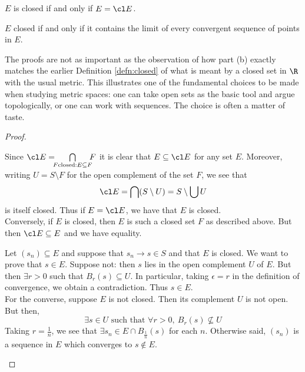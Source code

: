 \begin{thm}
\begin{enumeratea}
	\item $E$ is closed if and only if $E=\cl E$.
	\item $E$ closed if and only if it contains the limit of every convergent sequence of points in $E$.
\end{enumeratea}
\end{thm}

The proofs are not as important as the observation of how part (b) exactly matches the earlier Definition \ref{defn:closed} of what is meant by a closed set in $\R$ with the usual metric. This illustrates one of the fundamental choices to be made when studying metric spaces: one can take open sets as the basic tool and argue topologically, or one can work with sequences. The choice is often a matter of taste.

\begin{proof}
\begin{enumeratea}
	\item Since $\cl E=\!\!\!\bigcap\limits_{F\text{closed}: E\subseteq F}\!\!\!F$ it is clear that $E\subseteq\cl E$ for any set $E$. Moreover, writing $U=S\setminus F$ for the open complement of the set $F$, we see that
	\[\cl E=\bigcap (S\setminus U)=S\setminus\bigcup U\]
	is itself closed. Thus if $E=\cl E$, we have that $E$ is closed.\\
	Conversely, if $E$ is closed, then $E$ is such a closed set $F$ as described above. But then $\cl E\subseteq E$ and we have equality.
	\item Let $(s_n)\subseteq E$ and suppose that $s_n\to s\in S$ and that $E$ is closed. We want to prove that $s\in E$. Suppose not: then $s$ lies in the open complement $U$ of $E$. But then $\exists r>0$ such that $B_r(s)\subseteq U$. In particular, taking $\epsilon=r$ in the definition of convergence, we obtain a contradiction. Thus $s\in E$.\\
	For the converse, suppose $E$ is not closed. Then its complement $U$ is not open. But then,
	\[\exists s\in U\text{ such that }\forall r>0,\ B_r(s)\not\subseteq U\]
	Taking $r=\frac 1n$, we see that $\exists s_n\in E\cap B_{\frac 1n}(s)$ for each $n$. Otherwise said, $(s_n)$ is a sequence in $E$ which converges to $s\not\in E$.\hfill\qedhere
\end{enumeratea}
\end{proof}

